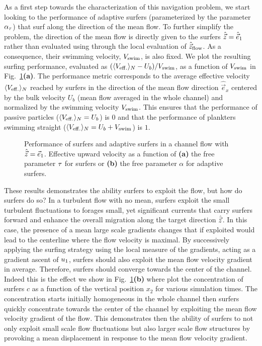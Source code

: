 As a first step towards the characterization of this navigation problem, we start looking to the performance of adaptive surfers (parameterized by the parameter $\alpha_{\tau}$) that surf along the direction of the mean flow.
To further simplify the problem, the direction of the mean flow is directly given to the surfers $\hat{\vec{z}} = \hat{\vec{e}}_1$ rather than evaluated using through the local evaluation of $\hat{\vec{z}}_{\mathrm{flow}}$.
As a consequence, their swimming velocity, $V_{\mathrm{swim}}$, is also fixed.
We plot the resulting surfing performance, evaluated as $(\langle V_{\mathrm{eff.}} \rangle_N - U_b)/V_{\mathrm{swim}}$, as a function of $V_{\mathrm{swim}}$ in Fig.~\ref{fig:channel_perf_x}\textbf{(a)}.
The performance metric corresponds to the average effective velocity $\langle V_{\mathrm{eff.}} \rangle_N$ reached by surfers in the direction of the mean flow direction $\hat{\vec{e}}_x$ centered by the bulk velocity $U_b$ (mean flow averaged in the whole channel) and normalized by the swimming velocity $V_{\mathrm{swim}}$.
This ensures that the performance of passive particles ($\langle V_{\mathrm{eff.}} \rangle_N = U_b$) is $0$ and that the performance of plankters swimming straight ($\langle V_{\mathrm{eff.}} \rangle_N = U_b + V_{\mathrm{swim}}$) is $1$.
\begin{figure}
	\centering
	
	\caption{
		Performance of surfers and adaptive surfers in a channel flow with $\hat{\vec{z}} = \vec{e}_1$. Effective upward velocity as a function of \textbf{(a)} the free parameter $\tau$ for surfers or \textbf{(b)} the free parameter $\alpha$ for adaptive surfers.
	}
	\label{fig:channel_perf_x}
\end{figure}

These results demonstrates the ability  surfers to exploit the flow, but how do surfers do so?
In a turbulent flow with no mean, surfers exploit the small turbulent fluctuations to forages small, yet significant currents that carry surfers forward and enhance the overall migration along the target direction $\hat{\vec{z}}$.
In this case, the presence of a mean large scale gradients changes that if exploited would lead to the centerline where the flow velocity is maximal.
By successively applying the surfing strategy using the local measure of the gradients, acting as a gradient ascent of $u_1$, surfers should also exploit the mean flow velocity gradient in average.
Therefore, surfers should converge towards the center of the channel.
Indeed this is the effect we show in Fig.~\ref{fig:channel_perf_x}\textbf{(b)} where plot the concentration of surfers $c$ as a function of the vertical position $x_2$ for various simulation times.
The concentration starts initially homogeneous in the whole channel then surfers quickly concentrate towards the center of the channel by exploiting the mean flow velocity gradient of the flow.
This demonstrates then the ability of surfers to not only exploit small scale flow fluctuations but also larger scale flow structures by provoking a mean displacement in response to the mean flow velocity gradient.


